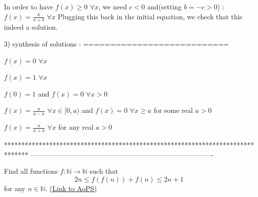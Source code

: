 \begin{solution}
In order to have $ f(x)\ge 0$ $ \forall x$, we need $ c<0$ and(setting $ b=-c>0$) : $ f(x)=\frac b{x+b}$ $ \forall x$
Plugging this back in the initial equation, we check that this indeed a solution.

3) synthesis of solutions :
===========================

$ f(x)=0$ $ \forall x$

$ f(x)=1$ $ \forall x$

$ f(0)=1$ and $ f(x)=0$ $ \forall x>0$

$ f(x)=\frac a{a-x}$ $ \forall x\in[0,a)$ and $ f(x)=0$ $ \forall x\ge a$ for some real $ a>0$

$ f(x)=\frac a{x+a}$ $ \forall x$ for any real $ a>0$
\end{solution}
*******************************************************************************
-------------------------------------------------------------------------------

\begin{problem}
	Find all functions $f: \mathbb N \to \mathbb N$ such that
\[ 2n \le f(f(n)) + f(n) \le 2n + 1\]
for any $n \in \mathbb N$.
	\flushright \href{https://artofproblemsolving.com/community/c6h307859}{(Link to AoPS)}
\end{problem}




